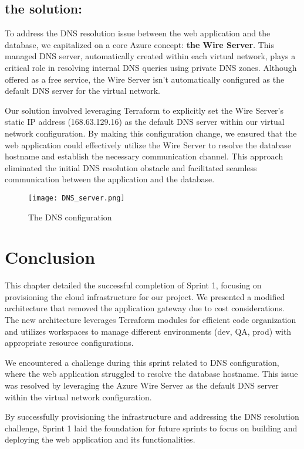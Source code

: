 \subsection*{the solution:}
To address the DNS resolution issue between the web application and the database, we capitalized on a core Azure concept: \textbf{the Wire Server}. This managed DNS server, automatically created within each virtual network, plays a critical role in resolving internal DNS queries using private DNS zones. Although offered as a free service, the Wire Server isn't automatically configured as the default DNS server for the virtual network.

Our solution involved leveraging Terraform to explicitly set the Wire Server's static IP address (168.63.129.16) as the default DNS server within our virtual network configuration. By making this configuration change, we ensured that the web application could effectively utilize the Wire Server to resolve the database hostname and establish the necessary communication channel. This approach eliminated the initial DNS resolution obstacle and facilitated seamless communication between the application and the database.

\begin{figure}[htpb]
    \centering
    \texttt{[image: DNS\_server.png]}
    \caption{The DNS configuration}
    \label{fig:dns_configuration}
\end{figure}

\section{Conclusion}
This chapter detailed the successful completion of Sprint 1, focusing on provisioning the cloud infrastructure for our project. We presented a modified architecture that removed the application gateway due to cost considerations. The new architecture leverages Terraform modules for efficient code organization and utilizes workspaces to manage different environments (dev, QA, prod) with appropriate resource configurations.
\par
We encountered a challenge during this sprint related to DNS configuration, where the web application struggled to resolve the database hostname. This issue was resolved by leveraging the Azure Wire Server as the default DNS server within the virtual network configuration.
\par
By successfully provisioning the infrastructure and addressing the DNS resolution challenge, Sprint 1 laid the foundation for future sprints to focus on building and deploying the web application and its functionalities.
